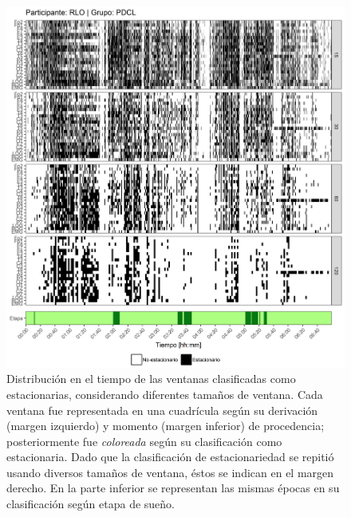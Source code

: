 \documentclass[12pt,letterpaper,draft]{book}
\begin{document}
\begin{figure}
\centering
\includegraphics[width=\linewidth]
{./scripts_graf_res/RLO_patrones_2.png}
\caption[Distribución en el tiempo de las ventanas clasificadas como estacionarias, considerando diferentes tamaños de ventana]{Distribución en el tiempo de las ventanas clasificadas como estacionarias, considerando diferentes tamaños de ventana. 
Cada ventana fue representada en una cuadrícula según su derivación (margen izquierdo) y momento (margen inferior) de procedencia; posteriormente fue \textit{coloreada} según su clasificación como estacionaria.
Dado que la clasificación de estacionariedad se repitió usando diversos tamaños de ventana, éstos se indican en el margen derecho.
En la parte inferior se representan las mismas épocas en su clasificación según etapa de sueño.}
\end{figure}
\end{document}
